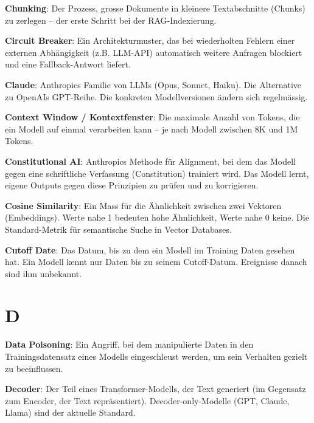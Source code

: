 \textbf{Chunking}\hspace{0pt}: Der Prozess, grosse Dokumente in kleinere Textabschnitte (Chunks) zu zerlegen -- der erste Schritt bei der RAG-Indexierung.

\textbf{Circuit Breaker}\hspace{0pt}: Ein Architekturmuster, das bei wiederholten Fehlern einer externen Abhängigkeit (z.B. LLM-API) automatisch weitere Anfragen blockiert und eine Fallback-Antwort liefert.

\textbf{Claude}\hspace{0pt}: Anthropics Familie von LLMs (Opus, Sonnet, Haiku). Die Alternative zu OpenAIs GPT-Reihe. Die konkreten Modellversionen ändern sich regelmässig.

\textbf{Context Window / Kontextfenster}\hspace{0pt}: Die maximale Anzahl von Tokens, die ein Modell auf einmal verarbeiten kann -- je nach Modell zwischen 8K und 1M Tokens.

\textbf{Constitutional AI}\hspace{0pt}: Anthropics Methode für Alignment, bei dem das Modell gegen eine schriftliche Verfassung (Constitution) trainiert wird. Das Modell lernt, eigene Outputs gegen diese Prinzipien zu prüfen und zu korrigieren.

\textbf{Cosine Similarity}\hspace{0pt}: Ein Mass für die Ähnlichkeit zwischen zwei Vektoren (Embeddings). Werte nahe 1 bedeuten hohe Ähnlichkeit, Werte nahe 0 keine. Die Standard-Metrik für semantische Suche in Vector Databases.

\textbf{Cutoff Date}\hspace{0pt}: Das Datum, bis zu dem ein Modell im Training Daten gesehen hat. Ein Modell kennt nur Daten bis zu seinem Cutoff-Datum. Ereignisse danach sind ihm unbekannt.

\section{D}

\textbf{Data Poisoning}\hspace{0pt}: Ein Angriff, bei dem manipulierte Daten in den Trainingsdatensatz eines Modells eingeschleust werden, um sein Verhalten gezielt zu beeinflussen.

\textbf{Decoder}\hspace{0pt}: Der Teil eines Transformer-Modells, der Text generiert (im Gegensatz zum Encoder, der Text repräsentiert). Decoder-only-Modelle (GPT, Claude, Llama) sind der aktuelle Standard.

